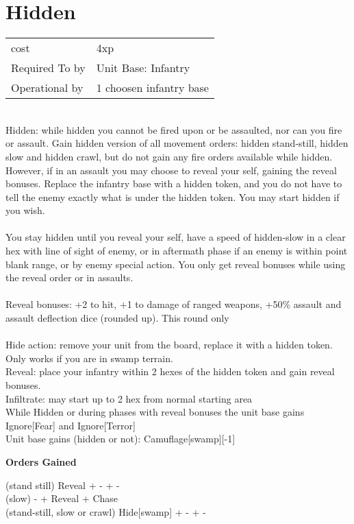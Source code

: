 \section{ Hidden }

\begin{tabular}{ll}
  cost & 4xp\\
  Required To by & Unit Base: Infantry\\
  Operational by & 1 choosen infantry base\\

\end{tabular}
\ \\
Hidden: while hidden you cannot be fired upon or be assaulted, nor can you fire or assault. Gain hidden version of all movement orders: hidden stand-still, hidden slow and hidden crawl,  but do not gain any fire orders available while hidden. However, if in an assault you may choose to reveal your self, gaining the reveal bonuses. Replace the infantry base with a hidden token, and you do not have to tell the enemy exactly what is under the hidden token. You may start hidden if you wish. \\ \ \\ You stay hidden until you reveal your self, have a speed of hidden-slow in a clear hex with line of sight of enemy, or in aftermath phase if an enemy is within point blank range, or by enemy special action. You only get reveal bonuses while using the reveal order or in assaults. \\ \ \\ Reveal bonuses: +2 to hit, +1 to damage of ranged weapons, +50\% assault and assault deflection dice (rounded up). This round only \\ \ \\ Hide action: remove your unit from the board, replace it with a hidden token. Only works if you are in swamp terrain. \\ Reveal: place your infantry within 2 hexes of the hidden token and gain reveal bonuses.\\ Infiltrate: may start up to 2 hex from normal starting area\\ While Hidden or during phases with reveal bonuses the unit base gains Ignore[Fear] and Ignore[Terror] \\ Unit base gains (hidden or not): Camuflage[swamp][-1]

{\bf Orders Gained    }

\noindent (stand still) Reveal + - + - \\(slow) - + Reveal + Chase\\(stand-still, slow or crawl) Hide[swamp] + - + -\\

